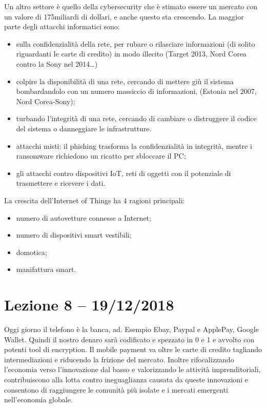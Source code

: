 \documentclass[a4page, 11pt]{article}
\begin{document}
Un altro settore è quello della cybersecurity che è stimato essere un mercato con un valore di 175miliardi di dollari, e anche questo sta crescendo.
La maggior parte degli attacchi informatici sono:
\begin{itemize}
  \item sulla confidenzialità della rete, per rubare o rilasciare informazioni (di solito riguardanti le carte di credito) in modo illecito (Target 2013, Nord Corea contro la Sony nel 2014\ldots{})
  \item colpire la disponibilità di una rete, cercando di mettere giù il sistema bombardandolo con un numero massiccio di informazioni, (Estonia nel 2007, Nord Corea-Sony);
  \item turbando l'integrità di una rete, cercando di cambiare o distruggere il codice del sistema o danneggiare le infrastrutture.
  \item attacchi misti: il phishing trasforma la confidenzialità in integrità, mentre i ransomware richiedono un ricatto per sbloccare il PC;
  \item gli attacchi contro dispositivi IoT, reti di oggetti con il potenziale di trasmettere e ricevere i dati.
\end{itemize}

La crescita dell'Internet of Things ha 4 ragioni principali:
\begin{itemize}
  \item numero di autovetture connesse a Internet;
  \item numero di dispositivi smart vestibili;
  \item domotica;
  \item manifattura smart.
\end{itemize}


\section*{Lezione 8 -- 19/12/2018}
Oggi giorno il telefono è la banca, ad. Esempio Ebay, Paypal e ApplePay, Google Wallet. Quindi il nostro denaro sarà codificato e spezzato in 0 e 1 e avvolto con potenti tool di encryption. Il mobile payment va oltre le carte di credito tagliando intermediazioni e riducendo la frizione del mercato. Inoltre rifocalizzando l’economia verso l’innovazione dal basso e valorizzando le attività imprenditoriali, contribuiscono alla lotta contro ineguaglianza causata da queste innovazioni e consentono di raggiungere le comunità più isolate e i mercati emergenti nell’economia globale.
\end{document}
